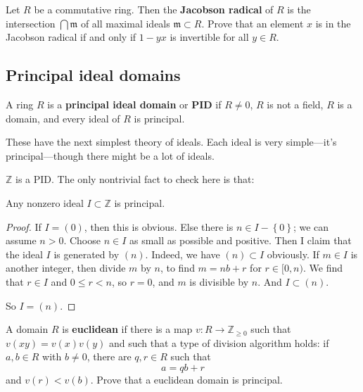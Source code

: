 \begin{exercise}\label{Jacobson} 
Let $R$ be a commutative ring. Then the \textbf{Jacobson radical} of $R$ is
the intersection $\bigcap \mathfrak{m}$ of all maximal ideals $\mathfrak{m}
\subset R$. Prove that an element $x$ is in the Jacobson radical if and only
if $1 - yx$ is invertible for all $y \in R$.
\end{exercise} 

\subsection{Principal ideal domains}

\begin{definition} 
A ring $R$ is a \textbf{principal ideal domain} or \textbf{PID} if $R \neq 0$, $R$ is not a
field, $R$ is a domain, and every ideal of $R$ is principal.
\end{definition} 

These have the next simplest theory of ideals.
Each ideal is very simple---it's principal---though there might be a lot of ideals.

\begin{example} 
$\mathbb{Z}$ is a PID. The only nontrivial fact to check here is that:
\begin{proposition} 
Any nonzero ideal $I \subset \mathbb{Z}$ is principal.
\end{proposition} 
\begin{proof} 
If $I = (0)$, then this is obvious.  Else there is $n \in I -
\left\{0\right\}$; we can assume $n>0$.  Choose $n \in I$ as small as possible and
positive. Then  I claim that the ideal $I$ is generated by $(n)$. Indeed, we have $(n)
\subset I$ obviously. If $m \in I$ is another integer, then divide $m$ by $n$,
to find $m = nb + r$ for $r \in [0, n)$. We find that $r \in I$ and $0 \leq r <
n$, so $r=0$, and $m$ is divisible by $n$. And $I \subset (n)$. 

So $I = (n)$.
\end{proof} 
\end{example} 


\begin{exercise} 
A domain $R$ is \textbf{euclidean} if there is a map $v: R \to
\mathbb{Z}_{\geq 0}$
such that $v(xy) = v(x)v(y)$ and such that a type of division algorithm
holds: if $a,b \in R$ with $b \neq 0$, there are $q,r \in R$ such that
\[ a = qb + r  \]
and $v(r)< v(b)$. Prove that a euclidean domain is principal.
\end{exercise} 

